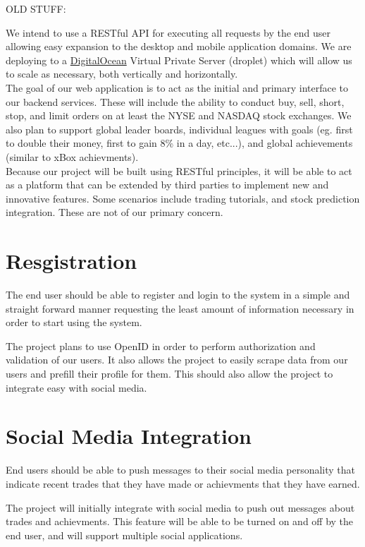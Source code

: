 \documentclass[11pt,letterpaper,oneside]{memoir}
\begin{document}
OLD STUFF:

We intend to use a RESTful API for executing all requests by the end user
allowing easy expansion to the desktop and mobile application domains. We are deploying to
a \href{http://www.digitialocean.com}{DigitalOcean} Virtual Private Server (droplet) which
will allow us to scale as necessary, both vertically and horizontally.\\

The goal of our web application is to act as the initial and primary interface to our backend
services. These will include the ability to conduct buy, sell, short, stop, and limit orders on
at least the NYSE and NASDAQ stock exchanges.  We also plan to support global leader boards,
individual leagues with goals (eg. first to double their money, first to gain 8\% in a day, etc...),
and global achievements (similar to xBox achievments).\\

Because our project will be built using RESTful principles, it will be able to act as a
platform that can be extended by third parties to implement new and innovative features.
Some scenarios include trading tutorials, and stock prediction integration.  These are not
of our primary concern.

\section{Resgistration}

The end user should be able to register and login to the system in a simple and straight forward
manner requesting the least amount of information necessary in order to start using the system.

The project plans to use OpenID in order to perform authorization and validation of our users.
It also allows the project to easily scrape data from our users and prefill their profile for them.
This should also allow the project to integrate easy with social media.

\section{Social Media Integration}

End users should be able to push messages to their social media personality that indicate
recent trades that they have made or achievments that they have earned.

The project will initially integrate with social media to push out messages about trades and
achievments. This feature will be able to be turned on and off by the end user, and will support
multiple social applications.
\end{document}
